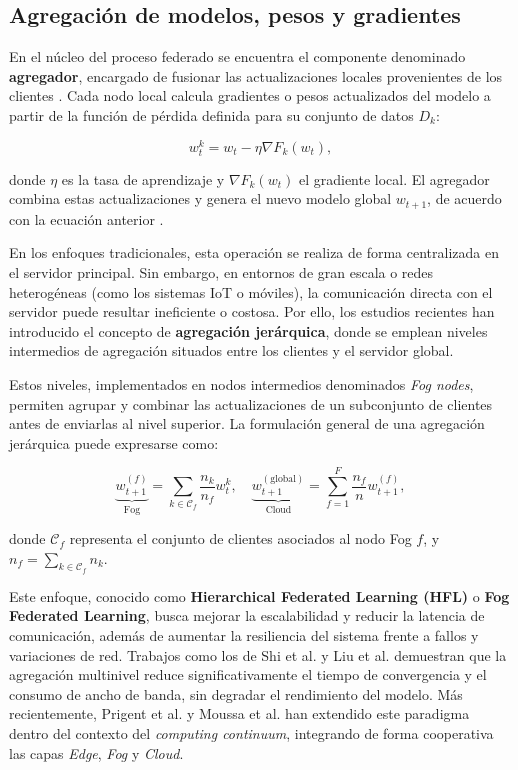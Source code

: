 \documentclass{report}
\begin{document}
\subsection{Agregación de modelos, pesos y gradientes}

En el núcleo del proceso federado se encuentra el componente denominado \textbf{agregador}, encargado de fusionar las actualizaciones locales provenientes de los clientes \cite{bonawitz2019towards}.  
Cada nodo local calcula gradientes o pesos actualizados del modelo a partir de la función de pérdida definida para su conjunto de datos \( D_k \):

\[
w_t^k = w_t - \eta \nabla F_k(w_t),
\]

donde \( \eta \) es la tasa de aprendizaje y \( \nabla F_k(w_t) \) el gradiente local.  
El agregador combina estas actualizaciones y genera el nuevo modelo global \( w_{t+1} \), de acuerdo con la ecuación anterior \cite{pmlr-v54-mcmahan17a}.  

En los enfoques tradicionales, esta operación se realiza de forma centralizada en el servidor principal. Sin embargo, en entornos de gran escala o redes heterogéneas (como los sistemas IoT o móviles), la comunicación directa con el servidor puede resultar ineficiente o costosa.  
Por ello, los estudios recientes han introducido el concepto de \textbf{agregación jerárquica}, donde se emplean niveles intermedios de agregación situados entre los clientes y el servidor global.  

Estos niveles, implementados en nodos intermedios denominados \textit{Fog nodes}, permiten agrupar y combinar las actualizaciones de un subconjunto de clientes antes de enviarlas al nivel superior.  
La formulación general de una agregación jerárquica puede expresarse como:

\[
\underbrace{w_{t+1}^{(f)}}_{\text{Fog}} = \sum_{k \in \mathcal{C}_f} \frac{n_k}{n_f} w_t^k,
\quad
\underbrace{w_{t+1}^{(\text{global})}}_{\text{Cloud}} = \sum_{f=1}^{F} \frac{n_f}{n} w_{t+1}^{(f)},
\]

donde \( \mathcal{C}_f \) representa el conjunto de clientes asociados al nodo Fog \( f \), y \( n_f = \sum_{k \in \mathcal{C}_f} n_k \).  

Este enfoque, conocido como \textbf{Hierarchical Federated Learning (HFL)} o \textbf{Fog Federated Learning}, busca mejorar la escalabilidad y reducir la latencia de comunicación, además de aumentar la resiliencia del sistema frente a fallos y variaciones de red.  
Trabajos como los de Shi et al. \cite{shi2020communication} y Liu et al. \cite{liu2022hierarchical} demuestran que la agregación multinivel reduce significativamente el tiempo de convergencia y el consumo de ancho de banda, sin degradar el rendimiento del modelo.  
Más recientemente, Prigent et al. \cite{prigent2024flcontinuum} y Moussa et al. \cite{moussa2023decentralised} han extendido este paradigma dentro del contexto del \textit{computing continuum}, integrando de forma cooperativa las capas \textit{Edge}, \textit{Fog} y \textit{Cloud}.
\end{document}
